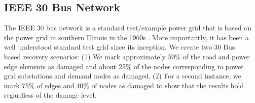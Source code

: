 \documentclass[10pt]{article}
\begin{document}
\subsection{IEEE 30 Bus Network}
 \vspace*{-12pt}
The IEEE 30 bus network is a standard test/example power grid that is based on the power grid in southern Illinois in the 1960s . More importantly, it has been a well understood standard test grid since its inception. We create two 30 Bus based recovery scenarios: (1) We mark approximately 50\% of the road and power edge elements as damaged and about 25\% of the nodes corresponding to power grid substations and demand nodes as damaged. (2) For a second instance, we mark 75\% of edges and 40\% of nodes as damaged to show that the results hold regardless of the damage level.

	
\end{document}

